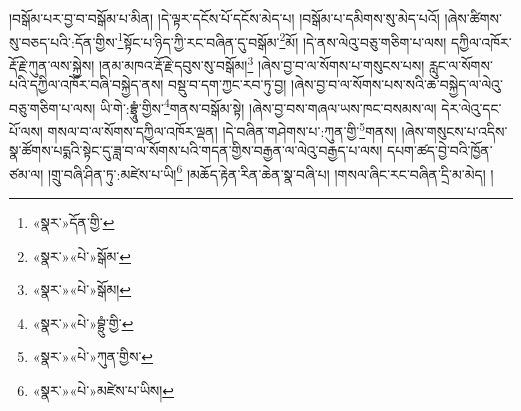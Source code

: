 །བསྒོམ་པར་བྱ་བ་བསྒོམ་པ་མིན། །དེ་ལྟར་དངོས་པོ་དངོས་མེད་པ། །བསྒོམ་པ་དམིགས་སུ་མེད་པའོ། །ཞེས་ཚིགས་སུ་བཅད་པའི་:དོན་གྱིས་\footnote{«སྣར་»དོན་གྱི་}སྟོང་པ་ཉིད་ཀྱི་རང་བཞིན་དུ་བསྒོམ་\footnote{«སྣར་»«པེ་»སྒོམ་}མོ། །དེ་ནས་ལེའུ་བཅུ་གཅིག་པ་ལས། དཀྱིལ་འཁོར་རྡོ་རྗེ་ཀུན་ལས་སྐྱེས། །ནམ་མཁའ་རྡོ་རྗེ་དབུས་སུ་བསྒོམ།\footnote{«སྣར་»«པེ་»སྒོམ།} །ཞེས་བྱ་བ་ལ་སོགས་པ་གསུངས་པས། རླུང་ལ་སོགས་པའི་དཀྱིལ་འཁོར་བཞི་བསྐྱེད་ནས། བསྡུ་བ་དག་ཀྱང་རབ་ཏུ་བྱ། །ཞེས་བྱ་བ་ལ་སོགས་པས་སའི་ཆ་བསྐྱེད་ལ་ལེའུ་བཅུ་གཅིག་པ་ལས། ཡི་གེ་:བྷྲཱུཾ་གྱིས་\footnote{«སྣར་»«པེ་»བྷྲུཾ་གྱི་}གནས་བསྒོམ་སྟེ། །ཞེས་བྱ་བས་གཞལ་ཡས་ཁང་བསམས་ལ། དེར་ལེའུ་དང་པོ་ལས། གསལ་བ་ལ་སོགས་དཀྱིལ་འཁོར་ལྡན། །དེ་བཞིན་གཤེགས་པ་:ཀུན་གྱི་\footnote{«སྣར་»«པེ་»ཀུན་གྱིས་}གནས། །ཞེས་གསུངས་པ་འདིས་སྣ་ཚོགས་པདྨའི་སྟེང་དུ་ཟླ་བ་ལ་སོགས་པའི་གདན་གྱིས་བརྒྱན་ལ་ལེའུ་བརྒྱད་པ་ལས། དཔག་ཚད་བྱེ་བའི་ཁྱོན་ཙམ་ལ། །གྲུ་བཞི་ཤིན་ཏུ་:མཛེས་པ་ཡི།\footnote{«སྣར་»«པེ་»མཛེས་པ་ཡིས།} །མཆོད་རྟེན་རིན་ཆེན་སྣ་བཞི་པ། །གསལ་ཞིང་རང་བཞིན་དྲི་མ་མེད། །
